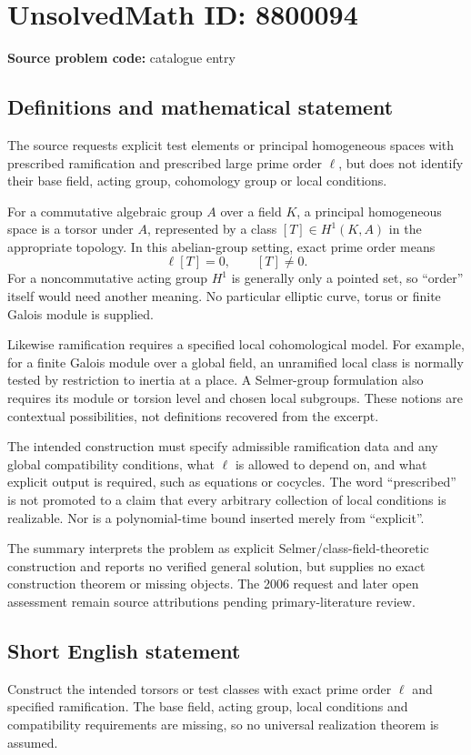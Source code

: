 \documentclass[11pt]{article}
\begin{document}
\section*{UnsolvedMath ID: 8800094}
\textbf{Source problem code:} catalogue entry
\subsection{Definitions and mathematical statement}
The source requests explicit test elements or principal homogeneous spaces with prescribed ramification and prescribed large prime order \(\ell\), but does not identify their base field, acting group, cohomology group or local conditions.

For a commutative algebraic group \(A\) over a field \(K\), a principal homogeneous space is a torsor under \(A\), represented by a class \([T]\in H^1(K,A)\) in the appropriate topology. In this abelian-group setting, exact prime order means
\[
 \ell[T]=0,\qquad[T]\ne0.
\]
For a noncommutative acting group \(H^1\) is generally only a pointed set, so ``order'' itself would need another meaning. No particular elliptic curve, torus or finite Galois module is supplied.

Likewise ramification requires a specified local cohomological model. For example, for a finite Galois module over a global field, an unramified local class is normally tested by restriction to inertia at a place. A Selmer-group formulation also requires its module or torsion level and chosen local subgroups. These notions are contextual possibilities, not definitions recovered from the excerpt.

The intended construction must specify admissible ramification data and any global compatibility conditions, what \(\ell\) is allowed to depend on, and what explicit output is required, such as equations or cocycles. The word ``prescribed'' is not promoted to a claim that every arbitrary collection of local conditions is realizable. Nor is a polynomial-time bound inserted merely from ``explicit''.

The summary interprets the problem as explicit Selmer/class-field-theoretic construction and reports no verified general solution, but supplies no exact construction theorem or missing objects. The 2006 request and later open assessment remain source attributions pending primary-literature review.
\subsection{Short English statement}
Construct the intended torsors or test classes with exact prime order \(\ell\) and specified ramification. The base field, acting group, local conditions and compatibility requirements are missing, so no universal realization theorem is assumed.
\end{document}
